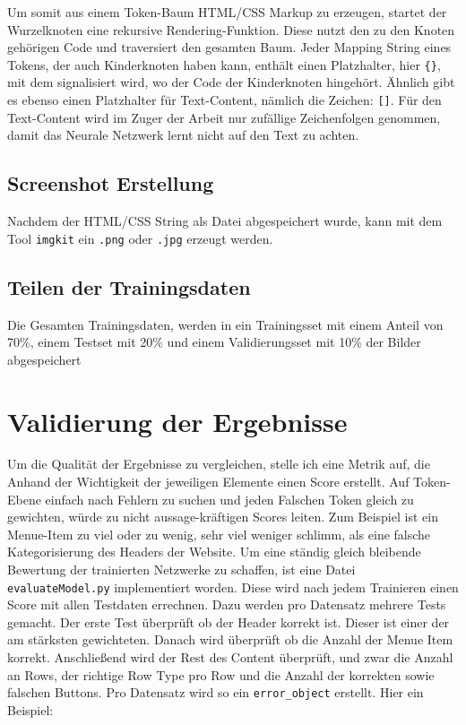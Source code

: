 \documentclass[pdftex,a4paper,halfparskip, article]{scrartcl}
\begin{document}
Um somit aus einem Token-Baum HTML/CSS Markup zu erzeugen, startet der Wurzelknoten eine rekursive Rendering-Funktion. Diese nutzt den zu den Knoten gehörigen Code und traversiert den gesamten Baum. Jeder Mapping String eines Tokens, der auch Kinderknoten haben kann, enthält einen Platzhalter, hier \texttt{\{\}}, mit dem signalisiert wird, wo der Code der Kinderknoten hingehört. Ähnlich gibt es ebenso einen Platzhalter für Text-Content, nämlich die Zeichen: \texttt{[]}. 
Für den Text-Content wird im Zuger der Arbeit nur zufällige Zeichenfolgen genommen, damit das Neurale Netzwerk lernt nicht auf den Text zu achten. 


\subsection{Screenshot Erstellung}

Nachdem der HTML/CSS String als Datei abgespeichert wurde, kann mit dem Tool \texttt{imgkit} ein \texttt{.png} oder \texttt{.jpg} erzeugt werden.

\subsection{Teilen der Trainingsdaten}

Die Gesamten Trainingsdaten, werden in ein Trainingsset mit einem Anteil von 70\%, einem Testset mit 20\% und einem Validierungsset mit 10\% der Bilder abgespeichert

\section{Validierung der Ergebnisse}

Um die Qualität der Ergebnisse zu vergleichen, stelle ich eine Metrik auf, die Anhand der Wichtigkeit der jeweiligen Elemente einen Score erstellt. Auf Token-Ebene einfach nach Fehlern zu suchen und jeden Falschen Token gleich zu gewichten, würde zu nicht aussage-kräftigen Scores leiten. Zum Beispiel ist ein Menue-Item zu viel oder zu wenig, sehr viel weniger schlimm, als eine falsche Kategorisierung des Headers der Website. Um eine ständig gleich bleibende Bewertung der trainierten Netzwerke zu schaffen, ist eine Datei \texttt{evaluateModel.py} implementiert worden. Diese wird nach jedem Trainieren einen Score mit allen Testdaten errechnen. Dazu werden pro Datensatz mehrere Tests gemacht. Der erste Test überprüft ob der Header korrekt ist. Dieser ist einer der am stärksten gewichteten. Danach wird überprüft ob die Anzahl der Menue Item korrekt. Anschließend wird der Rest des Content überprüft, und zwar die Anzahl an Rows, der richtige Row Type pro Row und die Anzahl der korrekten sowie falschen Buttons. Pro Datensatz wird so ein \texttt{error\_object} erstellt. 
Hier ein Beispiel:
\end{document}
